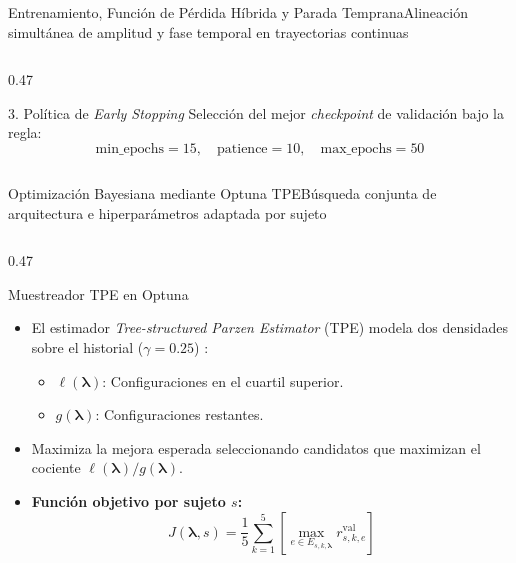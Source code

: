 \begin{frame}{Entrenamiento, Funci\'on de P\'erdida H\'ibrida y Parada Temprana}{Alineaci\'on simult\'anea de amplitud y fase temporal en trayectorias continuas \cite{wang2025dtcnet,loshchilov2019decoupled,rodas_valencia_tpe_ecog}}
\begin{columns}[T,onlytextwidth]
\begin{column}{0.47\textwidth}
      \begin{alertblock}{3. Pol\'itica de \textit{Early Stopping}}
        \scriptsize
        Selecci\'on del mejor \textit{checkpoint} de validaci\'on bajo la regla:
        \[
          \text{min\_epochs} = 15, \quad \text{patience} = 10, \quad \text{max\_epochs} = 50
        \]
      \end{alertblock}
    \end{column}
  \end{columns}
\end{frame}

\begin{frame}{Optimizaci\'on Bayesiana mediante Optuna TPE}{B\'usqueda conjunta de arquitectura e hiperpar\'ametros adaptada por sujeto \cite{Bergstra2011,akiba2019optuna,rodas_valencia_tpe_ecog}}
  \begin{columns}[T,onlytextwidth]
    \begin{column}{0.47\textwidth}
      \begin{block}{Muestreador TPE en Optuna}
        \scriptsize
        \begin{itemize}\setlength{\itemsep}{3pt}
          \item El estimador \textit{Tree-structured Parzen Estimator} (TPE) modela dos densidades sobre el historial ($\gamma = 0.25$) \cite{Bergstra2011,akiba2019optuna}:
            \begin{itemize}\scriptsize
              \item $\ell(\bm{\lambda})$: Configuraciones en el cuartil superior.
              \item $g(\bm{\lambda})$: Configuraciones restantes.
            \end{itemize}
          \item Maximiza la mejora esperada seleccionando candidatos que maximizan el cociente $\ell(\bm{\lambda}) / g(\bm{\lambda})$.
          \item \textbf{Funci\'on objetivo por sujeto $s$:}
            \[
              J(\bm{\lambda}, s) = \frac{1}{5}\sum_{k=1}^{5}\left[\max_{e \in E_{s,k,\bm{\lambda}}} r_{s,k,e}^{\text{val}}\right]
            \]
        \end{itemize}
      \end{block}
    \end{column}


\end{columns}
\end{frame}
